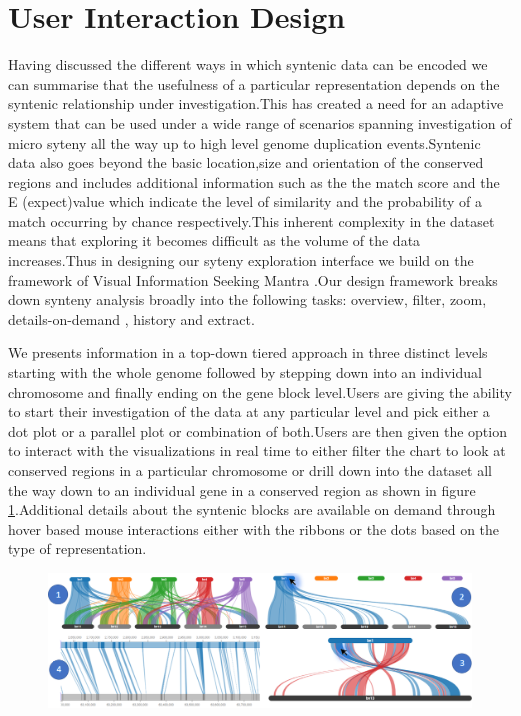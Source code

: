 \section{User Interaction Design}

Having discussed the different ways in which syntenic data can be encoded we can summarise that the usefulness of a particular representation depends on the syntenic relationship under investigation.This has created a need for an adaptive system that can be used under a wide range of scenarios spanning investigation of micro syteny all the way up to high level genome duplication events.Syntenic data also goes beyond the basic location,size and orientation of the conserved regions and includes additional information such as the the match score and the E (expect)value which indicate the level of similarity and the probability of a match occurring by chance respectively.This inherent complexity in the dataset means that exploring it becomes difficult as the volume of the data increases.Thus in designing our syteny exploration interface we build on the framework of Visual Information Seeking Mantra \cite{Shneiderman96theeyes}.Our design framework breaks down synteny analysis broadly into the following tasks: overview, filter, zoom, details-on-demand , history and extract.

We presents information in a top-down tiered approach in three distinct levels starting with the whole genome followed by stepping down into an individual chromosome and finally ending on the gene block level.Users are giving the ability to start their investigation of the data at any particular level and pick either a dot plot or a parallel plot or combination of both.Users are then given the option to interact with the visualizations in real time to either filter the chart to look at conserved regions in a particular chromosome or drill down into the dataset all the way down to an individual gene in a conserved region as shown in figure \ref{fig:ch_4_exploration_through_interaction}.Additional details about the syntenic blocks are available on demand through hover based mouse interactions either with the ribbons or the dots based on the type of representation.

\begin{figure}[h]
  \centering
  \includegraphics[width=1\linewidth]{images/ch_4_exploration_through_interaction.PNG}
  \label{fig:ch_4_exploration_through_interaction}
\end{figure}


